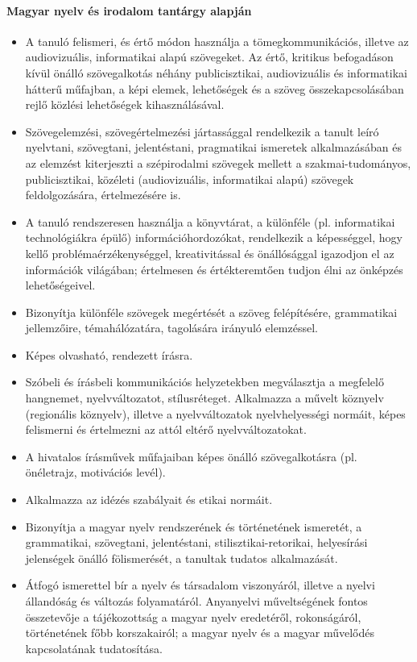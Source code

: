 \paragraph{Magyar nyelv és irodalom tantárgy alapján}
\begin{itemize}
\item A tanuló felismeri, és értő módon használja a tömegkommunikációs, illetve az audiovizuális, informatikai alapú szövegeket. Az értő, kritikus befogadáson kívül önálló szövegalkotás néhány publicisztikai, audiovizuális és informatikai hátterű műfajban, a képi elemek, lehetőségek és a szöveg összekapcsolásában rejlő közlési lehetőségek kihasználásával.
\item Szövegelemzési, szövegértelmezési jártassággal rendelkezik a tanult leíró nyelvtani, szövegtani, jelentéstani, pragmatikai ismeretek alkalmazásában és az elemzést kiterjeszti a szépirodalmi szövegek mellett a szakmai-tudományos, publicisztikai, közéleti (audiovizuális, informatikai alapú) szövegek feldolgozására, értelmezésére is.
\item A tanuló rendszeresen használja a könyvtárat, a különféle (pl. informatikai technológiákra épülő) információhordozókat, rendelkezik a képességgel, hogy kellő problémaérzékenységgel, kreativitással és önállósággal igazodjon el az információk világában; értelmesen és értékteremtően tudjon élni az önképzés lehetőségeivel.
\item Bizonyítja különféle szövegek megértését a szöveg felépítésére, grammatikai jellemzőire, témahálózatára, tagolására irányuló elemzéssel.
\item Képes olvasható, rendezett írásra.
\item Szóbeli és írásbeli kommunikációs helyzetekben megválasztja a megfelelő hangnemet, nyelvváltozatot, stílusréteget. Alkalmazza a művelt köznyelv (regionális köznyelv), illetve a nyelvváltozatok nyelvhelyességi normáit, képes felismerni és értelmezni az attól eltérő nyelvváltozatokat.
\item A hivatalos írásművek műfajaiban képes önálló szövegalkotásra (pl. önéletrajz, motivációs levél).
\item Alkalmazza az idézés szabályait és etikai normáit.
\item Bizonyítja a magyar nyelv rendszerének és történetének ismeretét, a grammatikai, szövegtani, jelentéstani, stilisztikai-retorikai, helyesírási jelenségek önálló fölismerését, a tanultak tudatos alkalmazását.
\item Átfogó ismerettel bír a nyelv és társadalom viszonyáról, illetve a nyelvi állandóság és változás folyamatáról. Anyanyelvi műveltségének fontos összetevője a tájékozottság a magyar nyelv eredetéről, rokonságáról, történetének főbb korszakairól; a magyar nyelv és a magyar művelődés kapcsolatának tudatosítása.

\end{itemize}
